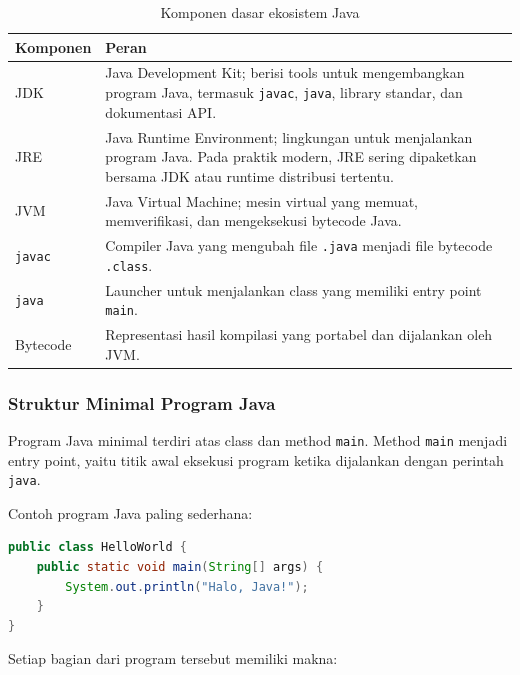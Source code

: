 \begin{table}[H]
\centering
\begin{tabularx}{\textwidth}{|L{0.25\textwidth}|X|}
\hline
\textbf{Komponen} & \textbf{Peran} \\
\hline
JDK & Java Development Kit; berisi tools untuk mengembangkan program Java, termasuk \texttt{javac}, \texttt{java}, library standar, dan dokumentasi API. \\
\hline
JRE & Java Runtime Environment; lingkungan untuk menjalankan program Java. Pada praktik modern, JRE sering dipaketkan bersama JDK atau runtime distribusi tertentu. \\
\hline
JVM & Java Virtual Machine; mesin virtual yang memuat, memverifikasi, dan mengeksekusi bytecode Java. \\
\hline
\texttt{javac} & Compiler Java yang mengubah file \texttt{.java} menjadi file bytecode \texttt{.class}. \\
\hline
\texttt{java} & Launcher untuk menjalankan class yang memiliki entry point \texttt{main}. \\
\hline
Bytecode & Representasi hasil kompilasi yang portabel dan dijalankan oleh JVM. \\
\hline
\end{tabularx}
\caption{Komponen dasar ekosistem Java}
\label{tab:komponen-ekosistem-java}
\end{table}

\subsubsection{Struktur Minimal Program Java}

\begin{jawab}
Program Java minimal terdiri atas class dan method \texttt{main}. Method \texttt{main} menjadi entry point, yaitu titik awal eksekusi program ketika dijalankan dengan perintah \texttt{java}.
\end{jawab}

Contoh program Java paling sederhana:

\begin{lstlisting}[language=Java, caption={Program Java minimal}, label={lst:java-minimal}]
public class HelloWorld {
    public static void main(String[] args) {
        System.out.println("Halo, Java!");
    }
}
\end{lstlisting}

Setiap bagian dari program tersebut memiliki makna:

